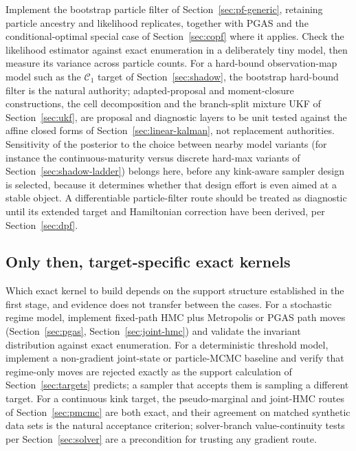 \documentclass[11pt]{article}
\begin{document}
Implement the bootstrap particle filter of Section~\ref{sec:pf-generic}, retaining
particle ancestry and likelihood replicates, together with PGAS and the
conditional-optimal special case of Section~\ref{sec:copf} where it applies. Check the
likelihood estimator against exact enumeration in a deliberately tiny model,
then measure its variance across particle counts. For a hard-bound
observation-map model such as the $\mathcal{C}_1$ target of Section~\ref{sec:shadow},
the bootstrap hard-bound filter is the natural authority; adapted-proposal and
moment-closure constructions, the cell decomposition and the branch-split
mixture UKF of Section~\ref{sec:ukf}, are proposal and diagnostic layers to be unit
tested against the affine closed forms of Section~\ref{sec:linear-kalman}, not
replacement authorities. Sensitivity of the posterior to the choice between
nearby model variants (for instance the continuous-maturity versus discrete
hard-max variants of Section~\ref{sec:shadow-ladder}) belongs here, before any
kink-aware sampler design is selected, because it determines whether that
design effort is even aimed at a stable object. A differentiable
particle-filter route should be treated as diagnostic until its extended
target and Hamiltonian correction have been derived, per Section~\ref{sec:dpf}.

\subsection*{Only then, target-specific exact kernels}

Which exact kernel to build depends on the support structure established in the first
stage, and evidence does not transfer between the cases. For a stochastic
regime model, implement fixed-path HMC plus Metropolis or PGAS path moves
(Section~\ref{sec:pgas}, Section~\ref{sec:joint-hmc}) and validate the invariant distribution
against exact enumeration. For a deterministic threshold model, implement a
non-gradient joint-state or particle-MCMC baseline and verify that regime-only
moves are rejected exactly as the support calculation of Section~\ref{sec:targets}
predicts; a sampler that accepts them is sampling a different target. For a
continuous kink target, the pseudo-marginal and joint-HMC routes of
Section~\ref{sec:pmcmc} are both exact, and their agreement on matched synthetic data
sets is the natural acceptance criterion; solver-branch value-continuity
tests per Section~\ref{sec:solver} are a precondition for trusting any gradient route.
\end{document}

